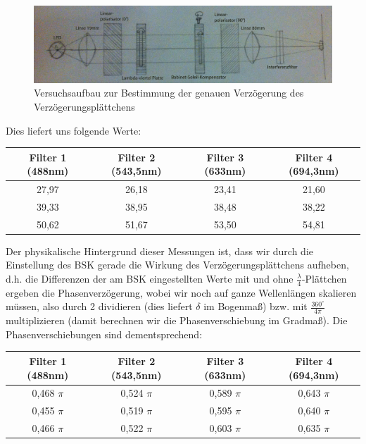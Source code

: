 \documentclass[bigchapter,colorback,accentcolor=tud4b,linedtoc,11pt]{tudreport}
\begin{document}
\begin{figure}[ht!]
\centering
\includegraphics[width=150mm]{img/skizzen/versuch_c_2.jpg}
\caption{Versuchsaufbau zur Bestimmung der genauen Verzögerung des Verzögerungsplättchens}
\end{figure}

Dies liefert uns folgende Werte:

\begin{center}
  \begin{tabular}{|c|c|c|c|}
    \hline
        Filter 1 (488nm) & Filter 2 (543,5nm) & Filter 3 (633nm) & Filter 4 (694,3nm) \\ \hline
        27,97 & 26,18 & 23,41 & 21,60 \\ \hline
        39,33 & 38,95 & 38,48 & 38,22 \\ \hline
        50,62 & 51,67 & 53,50 & 54,81 \\ \hline
	\end{tabular}
\end{center}


Der physikalische Hintergrund dieser Messungen ist, dass wir durch die Einstellung des BSK gerade die Wirkung des Verzögerungsplättchens aufheben, d.h. die Differenzen der am BSK eingestellten Werte mit und ohne  $\frac{\lambda}{4}$-Plättchen ergeben die Phasenverzögerung, wobei wir noch auf ganze Wellenlängen skalieren müssen, also durch 2 dividieren (dies liefert $\delta$ im Bogenmaß) bzw. mit $\frac{360^\circ}{4\pi}$ multiplizieren (damit berechnen wir die Phasenverschiebung im Gradmaß). Die Phasenverschiebungen sind dementsprechend: 

\begin{center}
  \begin{tabular}{|c|c|c|c|}
    \hline
        Filter 1 (488nm) & Filter 2 (543,5nm) & Filter 3 (633nm) & Filter 4 (694,3nm) \\ \hline
        0,468 $\pi$ & 0,524 $\pi$ & 0,589 $\pi$ & 0,643 $\pi$ \\ \hline
        0,455 $\pi$ & 0,519 $\pi$ & 0,595 $\pi$ & 0,640 $\pi$ \\ \hline
        0,466 $\pi$ & 0,522 $\pi$ & 0,603 $\pi$ & 0,635 $\pi$ \\ \hline
	\end{tabular}
\end{center}
\end{document}

